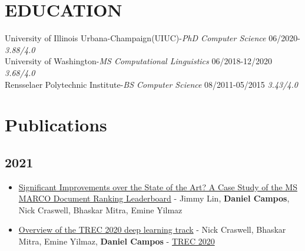 \documentclass[line,margin]{res}
\begin{document}
\address{707 S Birch Street, Urbana, Il (415)-272-9964 |\href{mailto:dcampos3@illinois.edu}{dcampos3@illinois.edu}|
\href{https://spacemanidol.github.io/}{https://spacemanidol.github.io/}}
\begin{resume}
\section{EDUCATION}
University of Illinois Urbana-Champaign(UIUC)-{\sl PhD Computer Science} 06/2020- {\sl 3.88/4.0}\\
University of Washington-{\sl MS Computational Linguistics} 06/2018-12/2020 {\sl 3.68/4.0} \\
Rensselaer Polytechnic Institute-{\sl BS Computer Science} 08/2011-05/2015  {\sl 3.43/4.0}
\section{Publications}
\subsection{2021}
\begin{itemize}
\itemsep -2pt
    \item \href{https://arxiv.org/abs/2102.12887}{Significant Improvements over the State of the Art? A Case Study of the MS MARCO Document Ranking Leaderboard} - Jimmy Lin, \textbf{Daniel Campos}, Nick Craswell, Bhaskar Mitra, Emine Yilmaz
    \item \href{https://arxiv.org/abs/2102.07662}{Overview of the TREC 2020 deep learning track} - Nick Craswell, Bhaskar Mitra, Emine Yilmaz, \textbf{Daniel Campos} - \href{https://trec.nist.gov/tracks.html}{TREC 2020}
\end{itemize}

\end{resume}
\end{document}
